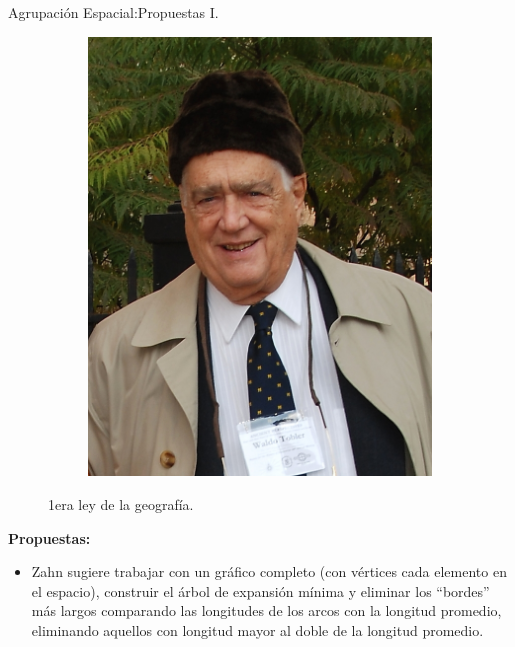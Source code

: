 \begin{frame}[fragile]{Agrupación Espacial:}{Propuestas I.}
\begin{figure}
\begin{subfigure}[b]{0.2\textwidth}
      \includegraphics[width=\textwidth]{./Imagenes/Waldo_Tobler_2007.jpg}
    \end{subfigure}
    \caption*{1era ley de la geografía.}
  \end{figure}
  \textbf{Propuestas:}
  \begin{itemize}
  \item Zahn sugiere trabajar con un gráfico completo (con vértices cada elemento en el espacio),
    construir el árbol de expansión mínima y eliminar los ``bordes'' más largos comparando las
    longitudes de los arcos con la longitud promedio, eliminando aquellos con longitud mayor al
    doble de la longitud promedio.
  \end{itemize}
\end{frame}
